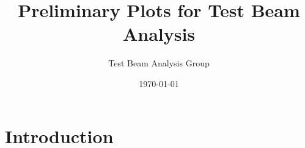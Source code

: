 \documentclass[slidestop,compress,mathserif]{beamer}
\title[Test-Beam Analysis]{Preliminary Plots for Test Beam Analysis}
\author[Test-Beam Analysis Group]{Test Beam Analysis Group}
\institute[CERN]{CMS, CERN}
\date{\today}
\begin{document}
\renewcommand{\inserttotalframenumber}{\pageref{lastslide}}
\begin{frame}
\titlepage
\end{frame}

\section{Introduction}




\end{document}
